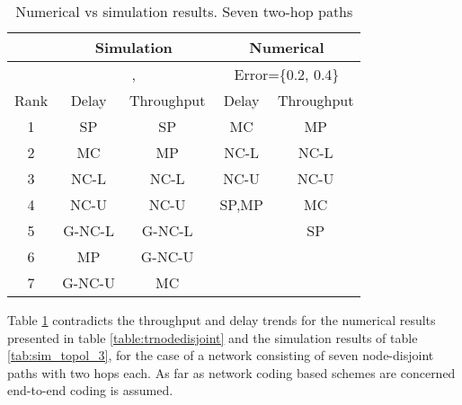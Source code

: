 \documentclass[journal, onecolumn, 12pt]{IEEEtran}
\begin{document}
\begin{table}[h]
\begin{center}
\scriptsize
\begin{tabular}{|c|c|c|c|c|}
\hline
     & \multicolumn{2}{|c|}{Simulation}     & \multicolumn{2}{|c|}{Numerical}                                   \\ \hline
     & \multicolumn{2}{|c|}{, } & \multicolumn{2}{|c|}{Error=\{0.2, 0.4\}} \\ \hline
Rank & Delay               & Throughput              & Delay            & Throughput            \\ \hline
1    & SP                 & SP                & MC              & MP          \\ \hline
2    & MC                 & MP                & NC-L              & NC-L      \\ \hline
3    & NC-L                & NC-L                & NC-U              & NC-U   \\ \hline
4    & NC-U                 & NC-U                & SP,MP              & MC   \\ \hline
5    & G-NC-L                 & G-NC-L                &               & SP     \\ \hline
6    & MP                 & G-NC-U                &               &           \\ \hline
7    & G-NC-U                 & MC                &               &           \\ \hline
\end{tabular}
\end{center}
\caption {Numerical vs simulation results. Seven two-hop paths}
\label{tab:comp_2}
\end{table}

Table \ref{tab:comp_2} contradicts the throughput and delay trends for the numerical results presented in table \ref{table:trnodedisjoint} and the simulation results of table \ref{tab:sim_topol_3},
for the case of a network consisting of seven node-disjoint paths with two hops each.
As far as network coding based schemes are concerned end-to-end coding is assumed.
\end{document}
